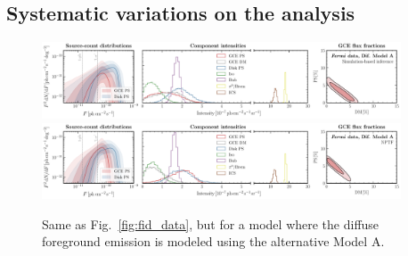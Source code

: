 \documentclass[prd,aps,10pt,nofootinbib,twocolumn,superscriptaddress,preprintnumbers,balancelastpage,longbibliography]{revtex4-1}
\begin{document}
\subsection{Systematic variations on the analysis}
\label{sec:systematics}





%
\begin{figure}
\centering
\includegraphics[width=0.95\textwidth]{plots/data_fid_sbi_modelA.pdf}
\includegraphics[width=0.95\textwidth]{plots/data_fid_nptf_modelA.pdf}
\caption{Same as Fig.~\ref{fig:fid_data}, but for a model where the diffuse foreground emission is modeled using the alternative Model A.}
\label{fig:fid_data_modelA}
\end{figure}
%
\end{document}
